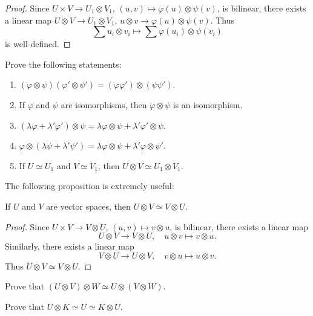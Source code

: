 \begin{proof}
	Since $U\times V\to U_1\otimes V_1$,
	$(u,v)\mapsto\varphi(u)\otimes\psi(v)$, is bilinear, there exists a linear map
	$U\otimes V\to U_1\otimes V_1$, $u\otimes
	v\to\varphi(u)\otimes\psi(v)$. Thus 
	\[
		\sum u_i\otimes v_i\mapsto\sum\varphi(u_i)\otimes\psi(v_i)
	\]
	is well-defined. 
\end{proof}

\begin{exercise}
    Prove the following statements:
	\begin{enumerate}
		\item $(\varphi\otimes\psi)(\varphi'\otimes\psi')=(\varphi\varphi')\otimes(\psi\psi')$.
		\item If $\varphi$ and $\psi$ are isomorphisms, then 
			$\varphi\otimes\psi$ is an isomorphism. 
		\item $(\lambda\varphi+\lambda'\varphi')\otimes\psi=\lambda\varphi\otimes\psi+\lambda'\varphi'\otimes\psi$.
		\item $\varphi\otimes(\lambda\psi+\lambda'\psi')=\lambda\varphi\otimes\psi+\lambda'\varphi\otimes\psi'$.
		\item If $U\simeq U_1$ and $V\simeq V_1$, then $U\otimes V\simeq U_1\otimes V_1$.
	\end{enumerate}
\end{exercise}

The following proposition is extremely useful:

\begin{proposition}
	If $U$ and $V$ are vector spaces, then  
	$U\otimes V\simeq V\otimes U$.
\end{proposition}

\begin{proof}
	Since $U\times V\to V\otimes U$, $(u,v)\mapsto v\otimes u$, is bilinear, there exists 
	a linear map 
    \[
    U\otimes V\to V\otimes U,\quad u\otimes
	v\mapsto v\otimes u.
    \]
    Similarly, there exists a linear map 
	\[
    V\otimes U\to U\otimes V,\quad  v\otimes u\mapsto
	u\otimes v.
    \]
    Thus $U\otimes V\simeq V\otimes U$.
\end{proof}

\begin{exercise}
	\label{xca:UxVxW}
    Prove that $(U\otimes V)\otimes W\simeq U\otimes(V\otimes W)$.
\end{exercise}

\begin{exercise}
	\label{xca:UxK}
	Prove that $U\otimes K\simeq U\simeq K\otimes U$.
\end{exercise}

